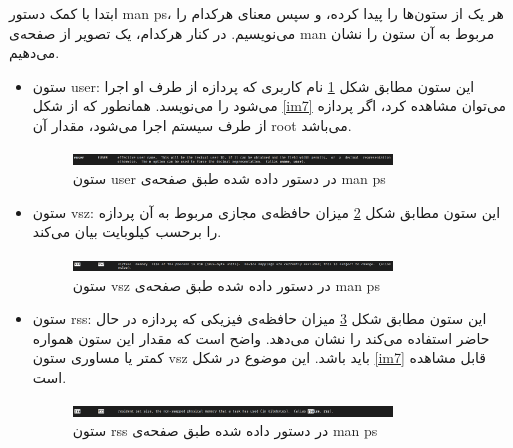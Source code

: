 \documentclass[12pt]{article}
\begin{document}
        ابتدا با کمک دستور
        \textenglish{man ps}،
        هر یک از ستون‌ها را پیدا کرده، و سپس معنای هرکدام را می‌نویسیم. در کنار هرکدام، یک تصویر از صفحه‌ی 
        \textenglish{man}
        مربوط به آن ستون را نشان می‌دهیم.

        \begin{itemize}
        \item ستون \textenglish{user}:
        این ستون مطابق شکل 
        \ref{im2}
        نام کاربری که پردازه از طرف او اجرا می‌شود را می‌نویسد. 
        همانطور که از شکل
        \ref{im7}
        می‌توان مشاهده کرد، اگر پردازه از طرف سیستم اجرا می‌شود، مقدار آن
        \textenglish{root}
        می‌باشد.

        \begin{figure}[H]
		\centering
		\includegraphics[width=0.8\textwidth]{report6-resources/2.png}
		\caption{ستون \textenglish{user} در دستور داده شده طبق صفحه‌ی \textenglish{man ps}}
            \label{im2}
	\end{figure}

        \item ستون \textenglish{vsz}:
        این ستون مطابق شکل 
        \ref{im3}
        میزان حافظه‌ی مجازی مربوط به آن پردازه را برحسب کیلوبایت بیان می‌کند.

        \begin{figure}[H]
		\centering
		\includegraphics[width=0.8\textwidth]{report6-resources/3.png}
		\caption{ستون \textenglish{vsz} در دستور داده شده طبق صفحه‌ی \textenglish{man ps}}
            \label{im3}
	\end{figure}

        \item ستون \textenglish{rss}:
        این ستون مطابق شکل 
        \ref{im4}
        میزان حافظه‌ی فیزیکی که پردازه در حال حاضر استفاده می‌کند را نشان می‌دهد. واضح است که مقدار این ستون همواره کمتر یا مساوری ستون
        \textenglish{vsz}
        باید باشد. این موضوع در شکل
        \ref{im7}
        قابل مشاهده است.

        \begin{figure}[H]
		\centering
		\includegraphics[width=0.8\textwidth]{report6-resources/4.png}
		\caption{ستون \textenglish{rss} در دستور داده شده طبق صفحه‌ی \textenglish{man ps}}
            \label{im4}
	\end{figure}


\end{itemize}
\end{document}
